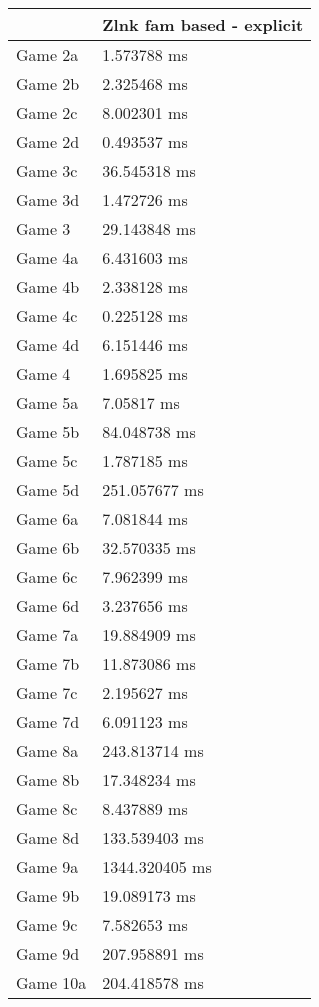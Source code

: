 \begin{multicols}{2}
\begin{tabular}{|l|l|}
\end{tabular}\\
\begin{tabular}{|l|l|}
	\hline
	& Zlnk fam based - explicit \\ \hline
	Game 2a & 1.573788 ms \\ \hline
	Game 2b & 2.325468 ms \\ \hline
	Game 2c & 8.002301 ms \\ \hline
	Game 2d & 0.493537 ms \\ \hline
	Game 3c & 36.545318 ms \\ \hline
	Game 3d & 1.472726 ms \\ \hline
	Game 3 & 29.143848 ms \\ \hline
	Game 4a & 6.431603 ms \\ \hline
	Game 4b & 2.338128 ms \\ \hline
	Game 4c & 0.225128 ms \\ \hline
	Game 4d & 6.151446 ms \\ \hline
	Game 4 & 1.695825 ms \\ \hline
	Game 5a & 7.05817 ms \\ \hline
	Game 5b & 84.048738 ms \\ \hline
	Game 5c & 1.787185 ms \\ \hline
	Game 5d & 251.057677 ms \\ \hline
	Game 6a & 7.081844 ms \\ \hline
	Game 6b & 32.570335 ms \\ \hline
	Game 6c & 7.962399 ms \\ \hline
	Game 6d & 3.237656 ms \\ \hline
	Game 7a & 19.884909 ms \\ \hline
	Game 7b & 11.873086 ms \\ \hline
	Game 7c & 2.195627 ms \\ \hline
	Game 7d & 6.091123 ms \\ \hline
	Game 8a & 243.813714 ms \\ \hline
	Game 8b & 17.348234 ms \\ \hline
	Game 8c & 8.437889 ms \\ \hline
	Game 8d & 133.539403 ms \\ \hline
	Game 9a & 1344.320405 ms \\ \hline
	Game 9b & 19.089173 ms \\ \hline
	Game 9c & 7.582653 ms \\ \hline
	Game 9d & 207.958891 ms \\ \hline
	Game 10a & 204.418578 ms \\ \hline

\end{tabular}
\end{multicols}
